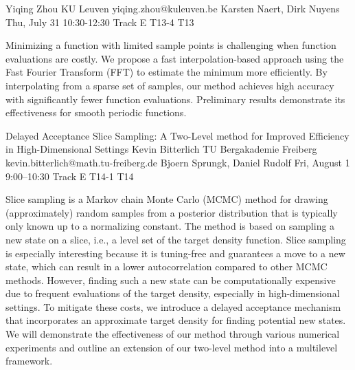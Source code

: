 \begin{talk}
  {Yiqing Zhou}%
  {KU Leuven}%
  {yiqing.zhou@kuleuven.be}%
  {Karsten Naert, Dirk Nuyens}%
  {}%
  {}%
  {Thu, July 31 10:30-12:30 Track E}%
  {T13-4}%
  {T13}%
  
				
			
Minimizing a function with limited sample points is challenging when function evaluations are costly. We propose a fast interpolation-based approach using the Fast Fourier Transform (FFT) to estimate the minimum more efficiently. By interpolating from a sparse set of samples, our method achieves high accuracy with significantly fewer function evaluations. Preliminary results demonstrate its effectiveness for smooth periodic functions.
\end{talk}

\begin{talk}
  {Delayed Acceptance Slice Sampling: A Two-Level method for Improved Efficiency in High-Dimensional Settings}%
  {Kevin Bitterlich}%
  {TU Bergakademie Freiberg}%
  {kevin.bitterlich@math.tu-freiberg.de}%
  {Bjoern Sprungk, Daniel Rudolf}%
  {}%
  {Fri, August 1 9:00–10:30 Track E}%
  {T14-1}%
  {T14}%
  
				
			
Slice sampling is a Markov chain Monte Carlo (MCMC) method for drawing (approximately) random samples from a posterior distribution that 
is typically only known up to a normalizing constant. 
The method is based on sampling a new state on a slice, i.e., a level set of the target density function. 
Slice sampling is especially interesting because it is tuning-free and guarantees a move to a new state, which can 
result in a lower autocorrelation compared to other MCMC methods. 
However, finding such a new state can be computationally expensive due to frequent evaluations of the target density, 
especially in high-dimensional settings. 
To mitigate these costs, we introduce a delayed acceptance mechanism that incorporates an approximate target density for finding potential 
new states. We will demonstrate the effectiveness of our method through various numerical experiments and outline an extension of our two-level method into a multilevel framework.


\end{talk}

